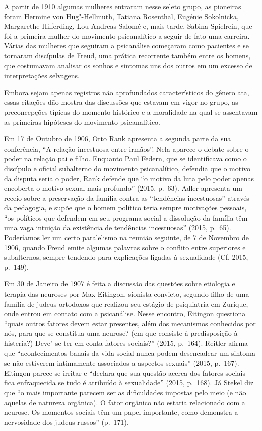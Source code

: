 A partir de 1910 algumas mulheres entraram nesse seleto grupo, as
pioneiras foram Hermine von Hug"-Hellmuth, Tatiana Rosenthal, Eugénie
Sokolnicka, Margarethe Hilferding, Lou Andreas Salomé e, mais tarde,
Sabina Spielrein, que foi a primeira mulher do movimento psicanalítico a
seguir de fato uma carreira. Várias das mulheres que seguiram a
psicanálise começaram como pacientes e se tornaram discípulas de Freud,
uma prática recorrente também entre os homens, que costumavam analisar
os sonhos e sintomas uns dos outros em um excesso de interpretações
selvagens.

Embora sejam apenas registros não aprofundados característicos do gênero
ata, essas citações dão mostra das discussões que estavam em vigor no
grupo, as preconcepções típicas do momento histórico e a moralidade na
qual se assentavam as primeiras hipóteses do movimento psicanalítico.

Em 17 de Outubro de 1906, Otto Rank apresenta a segunda parte da sua
conferência, ``A relação incestuosa entre irmãos''. Nela aparece o
debate sobre o poder na relação pai e filho. Enquanto Paul Federn, que
se identificava como o discípulo e oficial subalterno do movimento
psicanalítico, defendia que o motivo da disputa seria o poder, Rank
defende que ``o motivo da luta pelo poder apenas encoberta o motivo
sexual mais profundo'' (2015, p.~63). Adler apresenta um receio sobre a
preservação da família contra as ``tendências incestuosas'' através da
pedagogia, e supõe que o homem político teria sempre motivações
pessoais, ``os políticos que defendem em seu programa social a dissolução
da família têm uma vaga intuição da existência de tendências
incestuosas'' (2015, p.~65). Poderíamos ler um certo paralelismo na
reunião seguinte, de 7 de Novembro de 1906, quando Freud emite algumas
palavras sobre o conflito entre superiores e subalternos, sempre
tendendo para explicações ligadas à sexualidade (Cf. 2015, p.~149).

Em 30 de Janeiro de 1907 é feita a discussão das questões sobre
etiologia e terapia das neuroses por Max Eitingon, sionista convicto,
segundo filho de uma família de judeus ortodoxos que realizou seu
estágio de psiquiatria em Zurique, onde entrou em contato com a
psicanálise. Nesse encontro, Eitingon questiona ``quais outros fatores
devem estar presentes, além dos mecanismos conhecidos por nós, para que
se constitua uma neurose? (em que consiste à predisposição à histeria?)
Deve"-se ter em conta fatores sociais?'' (2015, p.~164). Reitler afirma
que ``acontecimentos banais da vida social nunca podem desencadear um
sintoma se não estiverem intimamente associados a aspectos sexuais''
(2015, p.~167). Eitingon parece se irritar e ``declara que sua questão
acerca dos fatores sociais fica enfraquecida se tudo é atribuído à
sexualidade'' (2015, p.~168). Já Stekel diz que ``o mais importante
parecem ser as dificuldades impostas pelo meio (e não aquelas de
natureza orgânica). O fator orgânico não estaria relacionado com a
neurose. Os momentos sociais têm um papel importante, como demonstra a
nervosidade dos judeus russos'' (p.~171).

